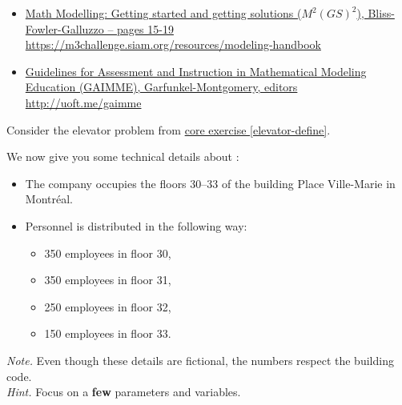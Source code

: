 \begin{lesson}
\begin{annotation}
	\vspace{-20pt}
	\begin{goals}
	\end{goals}
	\begin{goals}
		\Goal{GAIMME}
		\qrcode{http://uoft.me/gaimme}
	\end{goals}
\end{annotation}
	
	\begin{itemize}
		\item \href{https://m3challenge.siam.org/resources/modeling-handbook}{Math Modelling: Getting started and getting solutions ($M^2(GS)^2$), Bliss-Fowler-Galluzzo -- pages 15-19} \\
		\hfill \url{https://m3challenge.siam.org/resources/modeling-handbook}
		
		\item \href{http://uoft.me/gaimme}{Guidelines for Assessment and Instruction in Mathematical Modeling Education (GAIMME), Garfunkel-Montgomery, editors}
		\hfill \url{http://uoft.me/gaimme}
	\end{itemize}
\end{lesson}





\begin{minipage}{.5\textwidth}	
\question
\label{elevator-assumptions}
Consider the elevator problem from \hyperref[elevator-define]{core exercise \ref{elevator-define}}. 


We now give you some technical details about :

\begin{itemize}
	\item The company occupies the floors 30--33 of the building Place Ville-Marie in Montr\'eal.

	\item Personnel is distributed in the following way: 
	\begin{itemize}
		\item 350 employees in floor 30,
		\item 350 employees in floor 31,
		\item 250 employees in floor 32, 
		\item 150 employees in floor 33.
	\end{itemize}
\end{itemize}

\emph{Note.} Even though these details are fictional, the numbers respect the building code. \\

\emph{Hint.} Focus on a \textbf{few} parameters and variables.
\end{minipage}
\qquad
\begin{minipage}{.5\textwidth}	
\email
\end{minipage}

